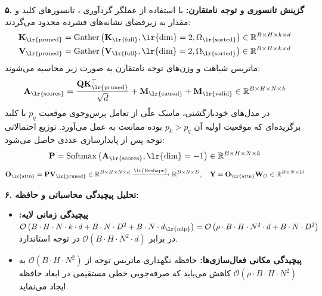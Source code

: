 \textbf{۵. گزینش تانسوری و توجه نامتقارن:}
با استفاده از عملگر گردآوری ، تانسورهای کلید و مقدار به زیرفضای نشانه‌های فشرده محدود می‌گردند:
\begin{align}
\mathbf{K}_{\text{\lr{pruned}}} &= \operatorname{Gather}\left(\mathbf{K}_{\text{\lr{full}}}, \text{\lr{dim}}=2, \Omega_{\text{\lr{sorted}}}\right) \in \mathbb{R}^{B \times H \times k \times d} \\
\mathbf{V}_{\text{\lr{pruned}}} &= \operatorname{Gather}\left(\mathbf{V}_{\text{\lr{full}}}, \text{\lr{dim}}=2, \Omega_{\text{\lr{sorted}}}\right) \in \mathbb{R}^{B \times H \times k \times d}
\end{align}
ماتریس شباهت و وزن‌های توجه نامتقارن به صورت زیر محاسبه می‌شوند:
\begin{equation}
\mathbf{A}_{\text{\lr{scores}}} = \frac{\mathbf{Q} \mathbf{K}_{\text{\lr{pruned}}}^\top}{\sqrt{d}} + \mathbf{M}_{\text{\lr{causal}}} + \mathbf{M}_{\text{\lr{valid}}} \in \mathbb{R}^{B \times H \times N \times k}
\end{equation}
در مدل‌های خودبازگشتی، ماسک علّی از تعامل پرس‌وجوی موقعیت $p_q$ با کلید برگزیده‌ای که موقعیت اولیه آن $p_k > p_q$ بوده ممانعت به عمل می‌آورد. توزیع احتمالاتی توجه پس از پایدارسازی عددی  حاصل می‌شود:
\begin{equation}
\mathbf{P} = \operatorname{Softmax}\left(\mathbf{A}_{\text{\lr{scores}}}, \text{\lr{dim}}=-1\right) \in \mathbb{R}^{B \times H \times N \times k}
\end{equation}
\begin{equation}
\mathbf{O}_{\text{\lr{attn}}} = \mathbf{P} \mathbf{V}_{\text{\lr{pruned}}} \in \mathbb{R}^{B \times H \times N \times d} \xrightarrow{\text{\lr{Reshape}}} \mathbb{R}^{B \times N \times D}, \quad \mathbf{Y} = \mathbf{O}_{\text{\lr{attn}}} \mathbf{W}_O \in \mathbb{R}^{B \times N \times D}
\end{equation}

\textbf{۶. تحلیل پیچیدگی محاسباتی و حافظه:}
\begin{itemize}
    \item \textbf{پیچیدگی زمانی لایه:} $\mathcal{O}\left(B \cdot H \cdot N \cdot k \cdot d + B \cdot N \cdot D^2 + B \cdot N \cdot d_{\text{\lr{mlp}}}\right) = \mathcal{O}\left(\rho \cdot B \cdot H \cdot N^2 \cdot d + B \cdot N \cdot D^2\right)$ در برابر $\mathcal{O}(B \cdot H \cdot N^2 \cdot d)$ در توجه استاندارد.
    \item \textbf{پیچیدگی مکانی فعال‌سازی‌ها:} حافظه نگهداری ماتریس توجه از $\mathcal{O}(B \cdot H \cdot N^2)$ به $\mathcal{O}(\rho \cdot B \cdot H \cdot N^2)$ کاهش می‌یابد که صرفه‌جویی خطی مستقیمی در ابعاد حافظه ایجاد می‌نماید.
\end{itemize}

